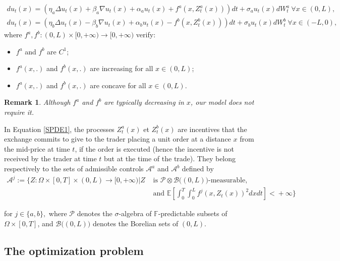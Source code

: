 \documentclass[11pt]{article}
\newtheorem{rem}{Remark}
\begin{document}
\begin{align}\label{SPDE1}
    du_t(x) = \left( \eta_a \Delta u_t(x) + \beta_a \nabla u_t(x) + \alpha_a u_t(x) +f^a(x, Z^a_t(x)) \right)dt + \sigma_a u_t(x) dW^a_t \ \forall x \in (0,L),\\
    du_t(x) = \left( \eta_b \Delta u_t(x) - \beta_b \nabla u_t(x) + \alpha_b u_t(x) -f^b(x, Z^b_t(x)) \right)dt + \sigma_b u_t(x) dW^b_t \ \forall x \in (-L,0),\nonumber
\end{align}
where $f^a, f^b: (0,L) \times [0,+\infty) \rightarrow [0,+\infty)$ verify:
\begin{itemize}
    \item $f^a$ and $f^b$ are $C^1$;
    \item $f^a(x,.)$ and $f^b(x,.)$ are increasing for all $x \in (0,L)$;
    \item $f^a(x,.)$ and $f^b(x,.)$ are concave for all $x \in (0,L)$.
\end{itemize}

\begin{rem}
Although $f^a$ and $f^b$ are typically decreasing in $x$, our model does not require it. 
\end{rem}

In Equation \eqref{SPDE1}, the processes $Z^a_t(x)$ et $Z^b_t(x)$ are incentives that the exchange commits to give to the trader placing a unit order at a distance $x$ from the mid-price at time $t$, if the order is executed (hence the incentive is not received by the trader at time $t$ but at the time of the trade). They belong respectively to the sets of admissible controls $\mathcal A^a$ and $\mathcal A^b$ defined by
\begin{align*}
\mathcal A^j\! :=\! \bigg\{ Z:\Omega \times [0,T] \times (0,L) \rightarrow [0,+\infty) \Big| Z &\text{ is } \mathcal P \otimes \mathcal B \big( (0,L) \big)\text{-measurable,}\\
&\text{ and } \mathbb E\! \left[\!\int_0^T \!\!\! \int_0^L f^j \left(x, Z_t(x) \right)^2 dx dt \right]\! <\!+\infty \! \bigg\}    
\end{align*}

for $j \in \{a,b\},$ where $\mathcal P$ denotes the $\sigma$-algebra of $\mathbb F$-predictable subsets of $\Omega \times [0,T]$, and $\mathcal B \big( (0,L) \big)$ denotes the Borelian sets of $(0,L)$.

\subsection{The optimization problem}
\end{document}
